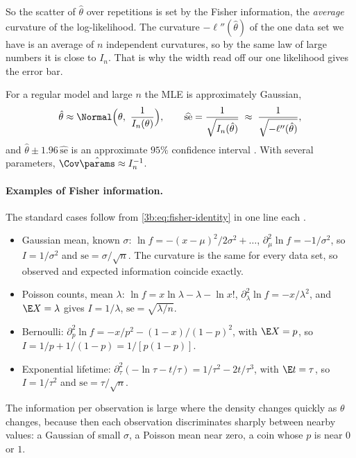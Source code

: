 So the scatter of $\hat\theta$ over repetitions is set by the Fisher
information, the \emph{average} curvature of the log-likelihood. The
curvature $-\ell''(\hat\theta)$ of the one data set we have is an average of
$n$ independent curvatures, so by the same law of large numbers it is close
to $I_n$. That is why the width read off our one likelihood gives the error
bar.

\begin{keyidea}
For a regular model and large $n$ the MLE is approximately Gaussian,
\[
  \hat\theta\approx\Normal\Bigl(\theta,\ \frac{1}{I_n(\theta)}\Bigr),\qquad
  \widehat{\mathrm{se}}=\frac{1}{\sqrt{I_n(\hat\theta)}}
  \;\approx\;\frac{1}{\sqrt{-\ell''(\hat\theta)}},
\]
and $\hat\theta\pm1.96\,\widehat{\mathrm{se}}$ is an approximate $95\%$
confidence interval . With several
parameters, $\Cov\hat\params\approx I_n^{-1}$.
\end{keyidea}

\paragraph{Examples of Fisher information.}
The standard cases follow from \eqref{3b:eq:fisher-identity} in one line
each .
\begin{itemize}
  \item Gaussian mean, known $\sigma$: $\ln f=-(x-\mu)^2/2\sigma^2+\dots$,
        $\partial^2_\mu\ln f=-1/\sigma^2$, so $I=1/\sigma^2$ and
        $\mathrm{se}=\sigma/\sqrt n$. The curvature is the same for every
        data set, so observed and expected information coincide exactly.
  \item Poisson counts, mean $\lambda$: $\ln f=x\ln\lambda-\lambda-\ln x!$,
        $\partial^2_\lambda\ln f=-x/\lambda^2$, and $\E X=\lambda$ gives
        $I=1/\lambda$, $\mathrm{se}=\sqrt{\lambda/n}$.
  \item Bernoulli: $\partial_p^2\ln f=-x/p^2-(1-x)/(1-p)^2$, with
        $\E X=p$, so $I=1/p+1/(1-p)=1/[p(1-p)]$.
  \item Exponential lifetime: $\partial^2_\tau(-\ln\tau-t/\tau)=1/\tau^2-2t/\tau^3$,
        with $\E t=\tau$, so $I=1/\tau^2$ and
        $\mathrm{se}=\tau/\sqrt n$.
\end{itemize}
The information per observation is large where the density changes quickly
as $\theta$ changes, because then each observation discriminates sharply
between nearby values: a Gaussian of small $\sigma$, a Poisson mean near
zero, a coin whose $p$ is near $0$ or $1$.

